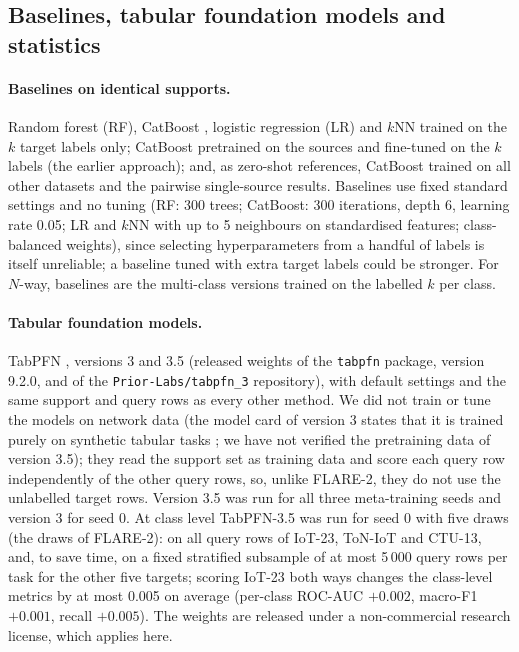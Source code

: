 \documentclass[pdflatex,sn-mathphys-num]{sn-jnl}%
\begin{document}
\subsection{Baselines, tabular foundation models and statistics}
\paragraph{Baselines on identical supports.}
Random forest (RF), CatBoost \citep{prokhorenkova2018catboost}, logistic regression (LR) and $k$NN trained on the $k$ target labels only; CatBoost pretrained on the sources and fine-tuned on the $k$ labels (the earlier approach); and, as zero-shot references, CatBoost trained on all other datasets and the pairwise single-source results.
Baselines use fixed standard settings and no tuning (RF: 300 trees; CatBoost: 300 iterations, depth 6, learning rate 0.05; LR and $k$NN with up to 5 neighbours on standardised features; class-balanced weights), since selecting hyperparameters from a handful of labels is itself unreliable; a baseline tuned with extra target labels could be stronger.
For $N$-way, baselines are the multi-class versions trained on the labelled $k$ per class.
\paragraph{Tabular foundation models.}
TabPFN \citep[the family of][]{hollmann2025tabpfn}, versions 3 and 3.5 (released weights of the \texttt{tabpfn} package, version 9.2.0, and of the \texttt{Prior-Labs/tabpfn\_3} repository), with default settings and the same support and query rows as every other method.
We did not train or tune the models on network data (the model card of version 3 states that it is trained purely on synthetic tabular tasks \citep{priorlabs2026tabpfn3}; we have not verified the pretraining data of version 3.5); they read the support set as training data and score each query row independently of the other query rows, so, unlike FLARE-2, they do not use the unlabelled target rows.
Version 3.5 was run for all three meta-training seeds and version 3 for seed 0.
At class level TabPFN-3.5 was run for seed 0 with five draws (the draws of FLARE-2): on all query rows of IoT-23, ToN-IoT and CTU-13, and, to save time, on a fixed stratified subsample of at most 5\,000 query rows per task for the other five targets; scoring IoT-23 both ways changes the class-level metrics by at most 0.005 on average (per-class ROC-AUC $+0.002$, macro-F1 $+0.001$, recall $+0.005$).
The weights are released under a non-commercial research license, which applies here.
\end{document}
